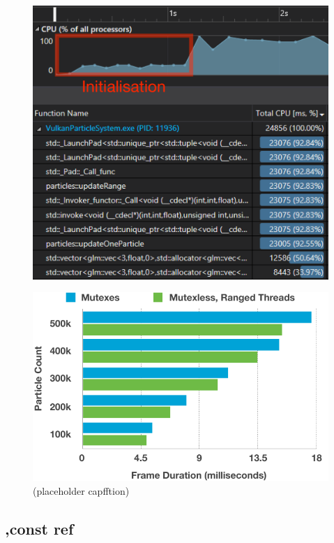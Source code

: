 \documentclass[11pt, a4paper, twocolumn]{article}
\begin{document}
\begin{figure}[h]
\includegraphics[width=\linewidth]{mutexless-diag}
\caption{}
\label{fig:mutexless-diag}
\end{figure}

\begin{figure}[h]
\includegraphics[width=\linewidth]{mutexes-rangedthreads}
\caption{(placeholder capfftion)}
\label{fig:mutexes-rangedthreads}
\end{figure}

\subsection{,const ref}
\end{document}
